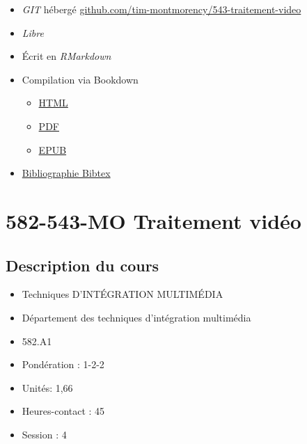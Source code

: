\documentclass[
]{book}
\providecommand{\tightlist}{%
  \setlength{\itemsep}{0pt}\setlength{\parskip}{0pt}}
\begin{document}
\begin{itemize}
\tightlist
\item
  \emph{GIT}\citep{torvalds_Git_2006} hébergé \href{https://github.com/tim-montmorency/543-traitement-video}{github.com/tim-montmorency/543-traitement-video}
\item
  \emph{Libre}\citep{stallman_GnuOrg_1983}
\item
  Écrit en \emph{RMarkdown}\citep{allaire_RmarkdownDynamicDocuments_2020}\\
\item
  Compilation via Bookdown\citep{xie_BookdownAuthoringBooks_2020}

  \begin{itemize}
  \tightlist
  \item
    \href{https://tim-montmorency.com/543-traitement-video/}{HTML}
  \item
    \href{https://tim-montmorency.com/543-traitement-video/traitement-video.pdf}{PDF}
  \item
    \href{https://tim-montmorency.com/543-traitement-video/traitement-video.epub}{EPUB}
  \end{itemize}
\item
  \href{https://github.com/tim-montmorency/543-traitement-video/blob/master/582543-traitement-video.bib}{Bibliographie Bibtex}
\end{itemize}

\hypertarget{mo-traitement-viduxe9o}{%
\chapter{582-543-MO Traitement vidéo}\label{mo-traitement-viduxe9o}}

\hypertarget{description-du-cours}{%
\section{Description du cours}\label{description-du-cours}}

\begin{itemize}
\tightlist
\item
  Techniques D'INTÉGRATION MULTIMÉDIA
\item
  Département des techniques d'intégration multimédia
\item
  582.A1
\item
  Pondération : 1-2-2
\item
  Unités: 1,66
\item
  Heures-contact : 45
\item
  Session : 4
\end{itemize}
\end{document}
